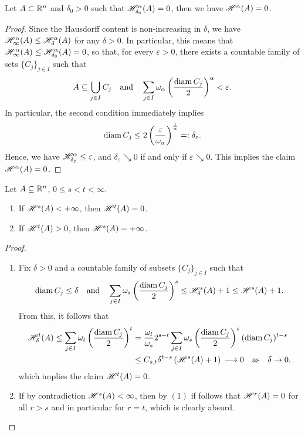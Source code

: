 \begin{lemma}
Let $A \subset \mathbb{R}^n$ and $\delta_{0} > 0$ such that $\mathscr{H}^{\alpha}_{\delta_{0}}(A) = 0$,
then we have $\mathscr{H}^{\alpha}(A) = 0$.
\end{lemma}

\begin{proof}
Since the Hausdorff content is non-increasing in $\delta$, we have $\mathscr{H}^{\alpha}_\infty(A) \le \mathscr{H}^{\alpha}_\delta(A)$ for any $\delta > 0$. In particular, this means that $\mathscr{H}^{\alpha}_{\infty}(A) \le \mathscr{H}^{\alpha}_{\delta_{0}}(A) = 0$, so that, for every $\varepsilon > 0$, there exists a countable family of sets $\{C_j\}_{j\in I}$ such that 
\[
A \subseteq
\bigcup_{j\in I} C_j 
\quad \text{and} \quad
\sum_{j\in I} \omega_\alpha \left(\frac{\operatorname{diam} C_j}{2} \right)^\alpha <
\varepsilon.
\]
In particular, the second condition immediately implies $$\operatorname{diam} C_j
\leq 2 \left(\frac{\varepsilon}{\omega_\alpha}\right)^{\frac{1}{\alpha}} = :
\delta_\varepsilon.$$ 
Hence, we have $\mathscr{H}^{\alpha}_{\delta_\varepsilon} \leq
\varepsilon$, and $\delta_\varepsilon \searrow 0$ if and only if $\varepsilon \searrow
0$. This implies the claim $\mathscr{H}^{\alpha}(A) = 0$.
\end{proof}

\begin{proposition} \label{prop:prop_Hausdorff_dim}
Let $A \subseteq \mathbb{R}^n$, $0 \leq s < t < \infty$.
\begin{enumerate}[(1)]
\item If $\mathscr{H}^{s}(A) < + \infty$, then $\mathscr{H}^{t}(A) = 0$. 
\item If $\mathscr{H}^{t}(A) > 0$, then $\mathscr{H}^{s}(A) = +\infty$.
\end{enumerate}
\end{proposition}
\begin{proof}
\begin{enumerate}[(1)]
\item Fix $\delta > 0$ and a countable family of subsets 
$\{C_j\}_{j\in I}$ such that 
\[
\operatorname{diam} C_j \leq \delta 
\quad \text{and} \quad
\sum_{j\in I} \omega_s
\left(\frac{\operatorname{diam} C_j}{2}\right)^s \leq \mathscr{H}^{s}_\delta(A) + 1 \leq
\mathscr{H}^{s}(A) + 1.
\]
From this, it follows that
\[
\begin{aligned}
\mathscr{H}^{t}_\delta(A) \leq \sum_{j\in I} \omega_t \left(\frac{\operatorname{diam} C_j}{2}\right)^t 
&= \frac{\omega_t}{\omega_s} 2^{s-t} \sum_{j\in I} \omega_s 
\left(\frac{\operatorname{diam} C_j}{2} \right)^s (\operatorname{diam} C_j)^{t-s}
\\ &\leq C_{s,t} \delta^{t-s} \left(\mathscr{H}^{s}(A) +1 \right) 
\, \longrightarrow 0 \quad \text{as} \quad \delta \to 0,
\end{aligned}
\]
which implies the claim $\mathscr{H}^{t}(A) = 0$.
\item If by contradiction $\mathscr{H}^{s}(A) < \infty$, then by $(1)$ if follows
that $\mathscr{H}^{r}(A) = 0$ for all $ r > s$ and in particular for $r = t$, which is clearly absurd.
\end{enumerate}
\end{proof}

